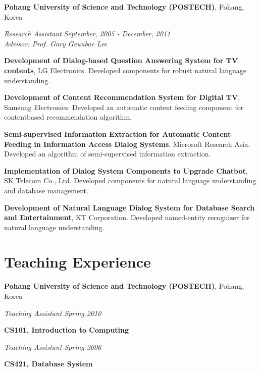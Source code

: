\documentclass[margin,line]{res}
\newenvironment{list1}{
  \begin{list}{\ding{113}}{%
      \setlength{\itemsep}{0in}
      \setlength{\parsep}{0in} \setlength{\parskip}{0in}
      \setlength{\topsep}{0in} \setlength{\partopsep}{0in}
      \setlength{\leftmargin}{0.17in}}}{\end{list}}
\begin{document}
\begin{resume}
{\bf Pohang University of Science and Technology (POSTECH)}, Pohang, Korea\\
\vspace{-.3cm}
\begin{list1}
\item[] {\em Research Assistant} \hfill {\em September, 2005 - December, 2011}\\
  {\em Advisor: Prof. Gary Geunbae Lee} \\
  \vspace{-.3cm}
  \begin{list1}
    \item[] {\bf Development of Dialog-based Question Answering System for TV contents}, LG Electronics. Developed components for robust natural language understanding.
    \item[] {\bf Development of Content Recommendation System for Digital TV}, Samsung Electronics. Developed an automatic content feeding component for contentbased recommendation algorithm.
    \item[] {\bf Semi-supervised Information Extraction for Automatic Content Feeding in Information Access Dialog Systems}, Microsoft Research Asia. Developed an algorithm of semi-supervised information extraction.
    \item[] {\bf Implementation of Dialog System Components to Upgrade Chatbot}, SK Telecom Co., Ltd. Developed components for natural language understanding and database management.
    \item[] {\bf Development of Natural Language Dialog System for Database Search and Entertainment}, KT Corporation. Developed named-entity recognizer for natural language understanding.
  \end{list1}
\end{list1}


\section{\sc Teaching Experience}
{\bf Pohang University of Science and Technology (POSTECH)}, Pohang, Korea\\
\vspace{-.3cm}
\begin{list1}
\item [] {\em Teaching Assistant} \hfill {\em Spring 2010}\\
  \vspace{-.3cm}
  \begin{list1}
  \item[] {\bf CS101, Introduction to Computing}
  \end{list1}
  \vspace{.3cm}
\item[] {\em Teaching Assistant} \hfill {\em Spring 2006}\\
  \vspace{-.3cm}
  \begin{list1}
  \item[] {\bf CS421, Database System}
  \end{list1}
\end{list1}


\end{resume}
\end{document}
